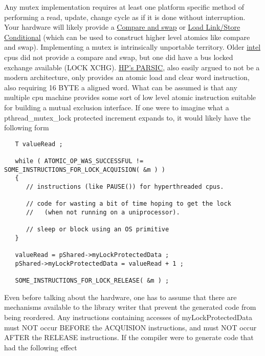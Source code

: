Any mutex implementation requires at least one platform specific method of performing a read, update, change cycle as if it is done without interruption.  Your hardware will likely provide a \href{http://en.wikipedia.org/wiki/Compare-and-swap}{Compare and swap} or \href{http://en.wikipedia.org/wiki/Load-Link/Store-Conditional}{Load Link/Store Conditional} (which can be used to construct higher level atomics like compare and swap).  Implementing a mutex is intrinsically unportable territory.  Older \href{http://download.intel.com/design/intarch/manuals/24319101.pdf}{intel} cpus did not provide a compare and swap, but one did have a bus locked exchange available (LOCK XCHG).
\href{http://ftp.parisc-linux.org/docs/arch/pa11_acd.pdf}{HP's PARSIC}, also easily argued to not be a modern architecture, only provides an atomic load and clear word instruction, also requiring 16 BYTE a aligned word.  What can be assumed is that any multiple cpu machine provides some sort of low level atomic instruction suitable for building a mutual exclusion interface.  If one were to imagine what a pthread\_mutex\_lock protected increment expands to, it would likely have the following form

\begin{lstlisting}
   T valueRead ;

   while ( ATOMIC_OP_WAS_SUCCESSFUL != SOME_INSTRUCTIONS_FOR_LOCK_ACQUISION( &m ) )
   {
      // instructions (like PAUSE()) for hyperthreaded cpus.

      // code for wasting a bit of time hoping to get the lock
      //   (when not running on a uniprocessor).

      // sleep or block using an OS primitive
   }

   valueRead = pShared->myLockProtectedData ;
   pShared->myLockProtectedData = valueRead + 1 ;

   SOME_INSTRUCTIONS_FOR_LOCK_RELEASE( &m ) ;
\end{lstlisting}

Even before talking about the hardware, one has to assume that there are mechanisms available to the library writer that prevent the generated code from being reordered.  Any instructions containing accesses of myLockProtectedData must NOT occur BEFORE the ACQUISION instructions, and must NOT occur AFTER the RELEASE instructions.  If the compiler were to generate code that had the following effect


